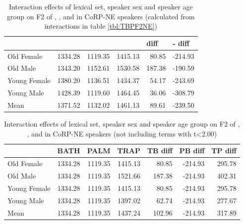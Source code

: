 \documentclass[../../../00.FullDoc/tex/APRReport-year4]{subfiles}
\begin{document}

\begin{table}[htbp]
	\centering
	\begin{tabular}{lrrrrr}
		\hline
		& \multicolumn{1}{l}{\bath{}} & \multicolumn{1}{l}{\palm{}} & \multicolumn{1}{l}{\trap{}} & \multicolumn{1}{l}{\TB{} diff} & \multicolumn{1}{l}{\palm{}-\bath{} diff} \\
		\hline
		Old Female & 1334.28 & 1119.35 & 1415.13 & 80.85 & -214.93 \\
		Old Male & 1343.20 & 1152.61 & 1530.58 & 187.38 & -190.59 \\
		Young Female & 1380.20 & 1136.51 & 1434.37 & 54.17 & -243.69 \\
		Young Male & 1428.39 & 1119.60 & 1464.45 & 36.06 & -308.79 \\
		Mean  & 1371.52 & 1132.02 & 1461.13 & 89.61 & -239.50 \\
		\hline
	\end{tabular}%
	\caption{Interaction effects of lexical set, speaker sex and speaker age group on F2 of \trap{}, \bath{}, and \palm{} in CoRP-NE speakers (calculated from interactions in table \ref{tbl:TBPF2NE})}
	\label{tbl:TBPF2NEinter}%
\end{table}%

\begin{table}[htbp]
	\centering
	\begin{tabular}{lrrrrrr}
		& \multicolumn{1}{l}{BATH} & \multicolumn{1}{l}{PALM} & \multicolumn{1}{l}{TRAP} & \multicolumn{1}{l}{TB diff} & \multicolumn{1}{l}{PB diff} & \multicolumn{1}{l}{TP diff} \\
		\hline
		Old Female & 1334.28 & 1119.35 & 1415.13 & 80.85 & -214.93 & 295.78 \\
		Old Male & 1334.28 & 1119.35 & 1521.66 & 187.38 & -214.93 & 402.31 \\
		Young Female & 1334.28 & 1119.35 & 1415.13 & 80.85 & -214.93 & 295.78 \\
		Young Male & 1334.28 & 1119.35 & 1397.02 & 62.74 & -214.93 & 277.67 \\
		\hline
		Mean  & 1334.28 & 1119.35 & 1437.24 & 102.96 & -214.93 & 317.89 \\
		\hline
	\end{tabular}%
	\caption{Interaction effects of lexical set, speaker sex and speaker age group on F2 of \trap{}, \bath{}, and \palm{} in CoRP-NE speakers (not including terms with t<2.00)}
	\label{tbl:TBPF2NEinter2}%
\end{table}%
\end{document}
